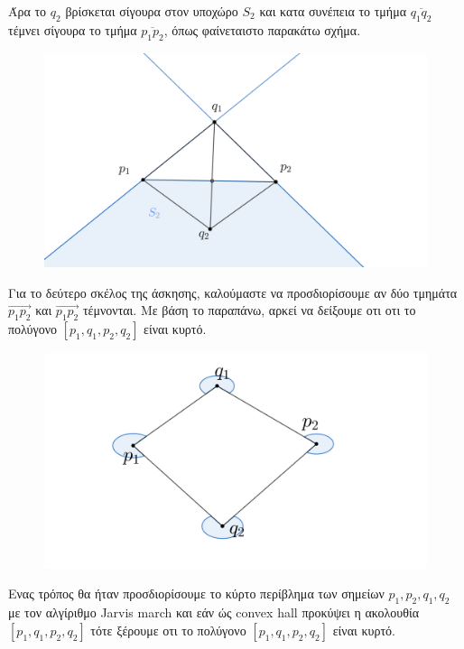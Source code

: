 \documentclass[12pt]{article}
\begin{document}
Άρα το $q_2$ βρίσκεται σίγουρα στον υποχώρο $S_2$ και κατα συνέπεια το τμήμα $\overline{q_1q_2}$  τέμνει σίγουρα το τμήμα $\overline{p_1p_2}$, όπως φαίνεταιστο παρακάτω σχήμα.
\begin{figure}[H]

    \centering
    \includegraphics[scale = 0.6]{ge4.png}\\ 
\end{figure} 
Για το δεύτερο σκέλος της άσκησης, καλούμαστε να προσδιορίσουμε αν δύο τμημάτα $\overrightarrow{p_1p_2}$ και $\overrightarrow{p_1p_2}$ τέμνονται. Με βάση το παραπάνω, αρκεί να δείξουμε οτι οτι το πολύγονο $[p_1,q_1,p_2,q_2]$ είναι κυρτό.
\begin{figure}[H]

    \centering
    \includegraphics[scale = 0.7]{geogebra-export(2).png}\\ 
\end{figure} 
Ενας τρόπος θα ήταν προσδιορίσουμε
το κύρτο περίβλημα των σημείων $p_1,p_2,q_1,q_2$ με τον αλγίριθμο \textlatin{Jarvis march} και εάν ώς \textlatin{convex hall} προκύψει η ακολουθία $[p_1,q_1,p_2,q_2]$ τότε ξέρουμε οτι το πολύγονο $[p_1,q_1,p_2,q_2]$ είναι κυρτό.\\
\end{document}
